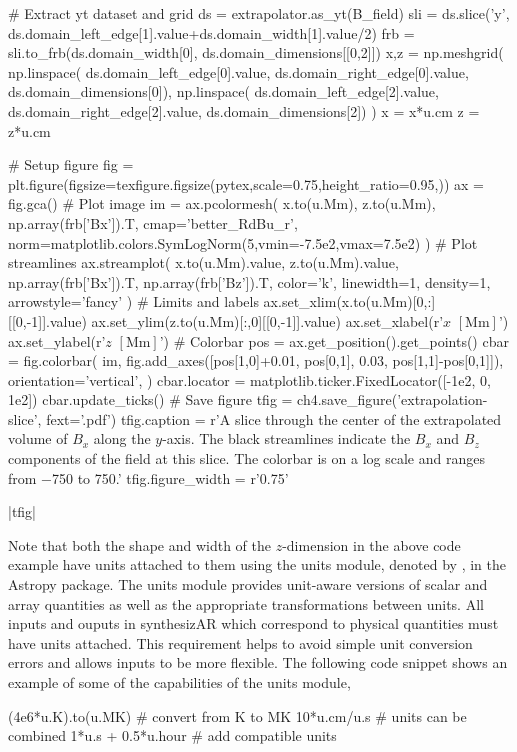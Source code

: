 \begin{pycode}[chapter4]
# Extract yt dataset and grid
ds = extrapolator.as_yt(B_field)
sli = ds.slice('y', ds.domain_left_edge[1].value+ds.domain_width[1].value/2)
frb = sli.to_frb(ds.domain_width[0], ds.domain_dimensions[[0,2]])
x,z = np.meshgrid(
    np.linspace(
        ds.domain_left_edge[0].value,
        ds.domain_right_edge[0].value,
        ds.domain_dimensions[0]),
    np.linspace(
        ds.domain_left_edge[2].value,
        ds.domain_right_edge[2].value,
        ds.domain_dimensions[2])
)
x = x*u.cm
z = z*u.cm

# Setup figure
fig = plt.figure(figsize=texfigure.figsize(pytex,scale=0.75,height_ratio=0.95,))
ax = fig.gca()
# Plot image
im = ax.pcolormesh(
    x.to(u.Mm), z.to(u.Mm),
    np.array(frb['Bx']).T,
    cmap='better_RdBu_r',
    norm=matplotlib.colors.SymLogNorm(5,vmin=-7.5e2,vmax=7.5e2)
)
# Plot streamlines
ax.streamplot(
    x.to(u.Mm).value, z.to(u.Mm).value,
    np.array(frb['Bx']).T, np.array(frb['Bz']).T,
    color='k', linewidth=1, density=1, arrowstyle='fancy'
)
# Limits and labels
ax.set_xlim(x.to(u.Mm)[0,:][[0,-1]].value)
ax.set_ylim(z.to(u.Mm)[:,0][[0,-1]].value)
ax.set_xlabel(r'$x$ $[\si{\mega\m}]$')
ax.set_ylabel(r'$z$ $[\si{\mega\m}]$')
# Colorbar
pos = ax.get_position().get_points()
cbar = fig.colorbar(
    im,
    fig.add_axes([pos[1,0]+0.01, pos[0,1], 0.03, pos[1,1]-pos[0,1]]),
    orientation='vertical',
)
cbar.locator = matplotlib.ticker.FixedLocator([-1e2, 0, 1e2])
cbar.update_ticks()
# Save figure
tfig = ch4.save_figure('extrapolation-slice', fext='.pdf')
tfig.caption = r'A slice through the center of the extrapolated volume of $B_x$ along the $y$-axis. The black streamlines indicate the $B_x$ and $B_z$ components of the field at this slice. The colorbar is on a log scale and ranges from \SI{-750 }{\gauss} to \SI{750 }{\gauss}.'
tfig.figure_width = r'0.75\textwidth'
\end{pycode}
\py[chapter4]|tfig|

Note that both the shape and width of the $z$-dimension in the above code example have units attached to them using the units module, denoted by , in the Astropy package. The units module provides unit-aware versions of scalar and array quantities as well as the appropriate transformations between units. All inputs and ouputs in synthesizAR which correspond to physical quantities must have units attached. This requirement helps to avoid simple unit conversion errors and allows inputs to be more flexible. The following code snippet shows an example of some of the capabilities of the units module,
\begin{pyblock}[chapter4][baselinestretch=1,xleftmargin=3em]
(4e6*u.K).to(u.MK)  # convert from K to MK
10*u.cm/u.s  # units can be combined
1*u.s + 0.5*u.hour  # add compatible units
\end{pyblock}

